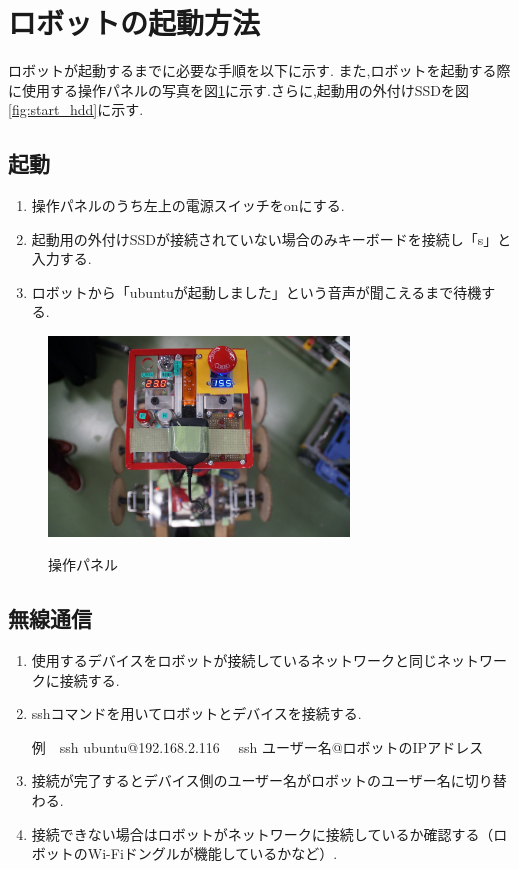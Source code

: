 \section{ロボットの起動方法}
ロボットが起動するまでに必要な手順を以下に示す.
また,ロボットを起動する際に使用する操作パネルの写真を図\ref{fig:start_panel}に示す.さらに,起動用の外付けSSDを図\ref{fig:start_hdd}に示す.
\subsection{起動}
\begin{enumerate}
\item 操作パネルのうち左上の電源スイッチをonにする.
\item 起動用の外付けSSDが接続されていない場合のみキーボードを接続し「s」と入力する.
\item ロボットから「ubuntuが起動しました」という音声が聞こえるまで待機する.
\end{enumerate}

\begin{figure}[htp]
 \begin{center}
  \includegraphics[width=80mm]{img/soft/DSC07946.jpg}
 　\caption{操作パネル}
  \label{fig:start_panel}%
 \end{center}
\end{figure}

\subsection{無線通信}
\begin{enumerate}
\item 使用するデバイスをロボットが接続しているネットワークと同じネットワークに接続する.
\item sshコマンドを用いてロボットとデバイスを接続する.

例　ssh ubuntu@192.168.2.116　 ssh ユーザー名@ロボットのIPアドレス   
\item 接続が完了するとデバイス側のユーザー名がロボットのユーザー名に切り替わる.
\item 接続できない場合はロボットがネットワークに接続しているか確認する（ロボットのWi-Fiドングルが機能しているかなど）.  
\end{enumerate}

